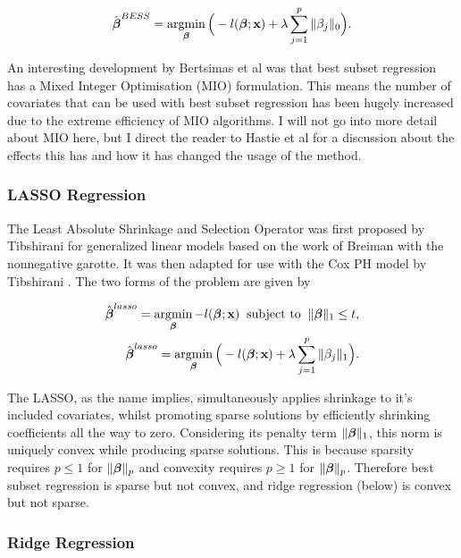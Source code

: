 \begin{equation}
    \hat{\boldsymbol{\beta}}^{BESS} = \operatorname*{argmin}_{\boldsymbol{\beta}}\Big(-l(\boldsymbol{\beta};\textbf{x})+\lambda\sum_{j=1}^p\Vert\beta_j\Vert_0\Big).
\end{equation}

An interesting development by Bertsimas et al  was that best subset regression has a Mixed Integer Optimisation (MIO) formulation. This means the number of covariates that can be used with best subset regression has been hugely increased due to the extreme efficiency of MIO algorithms. I will not go into more detail about MIO here, but I direct the reader to Hastie et al  for a discussion about the effects this has and how it has changed the usage of the method.

\subsubsection{LASSO Regression}\label{sec:LASSO}

The Least Absolute Shrinkage and Selection Operator was first proposed by Tibshirani  for generalized linear models based on the work of Breiman  with the nonnegative garotte. It was then adapted for use with the Cox PH model by Tibshirani . The two forms of the problem are given by

\begin{align}
    \hat{\boldsymbol{\beta}}^{lasso} =\operatorname*{argmin}_{\boldsymbol{\beta}} -l(\boldsymbol{\beta};\textbf{x})\;\;\textrm{subject to}\;\;\Vert\boldsymbol{\beta}\Vert_1\leq t,\\
    \hat{\boldsymbol{\beta}}^{lasso} = \operatorname*{argmin}_{\boldsymbol{\beta}}\Big(-l(\boldsymbol{\beta};\textbf{x})+\lambda\sum_{j=1}^p\Vert\beta_j\Vert_1\Big).
\end{align}

The LASSO, as the name implies, simultaneously applies shrinkage to it's included covariates, whilst promoting sparse solutions by efficiently shrinking coefficients all the way to zero. Considering its penalty term $\Vert\boldsymbol{\beta}\Vert_1$, this norm is uniquely convex while producing sparse solutions. This is because sparsity requires $p\leq1$ for $\Vert\boldsymbol{\beta}\Vert_p$ and convexity requires $p\geq1$ for $\Vert\boldsymbol{\beta}\Vert_p$. Therefore best subset regression is sparse but not convex, and ridge regression (below) is convex but not sparse.

\subsubsection{Ridge Regression}

